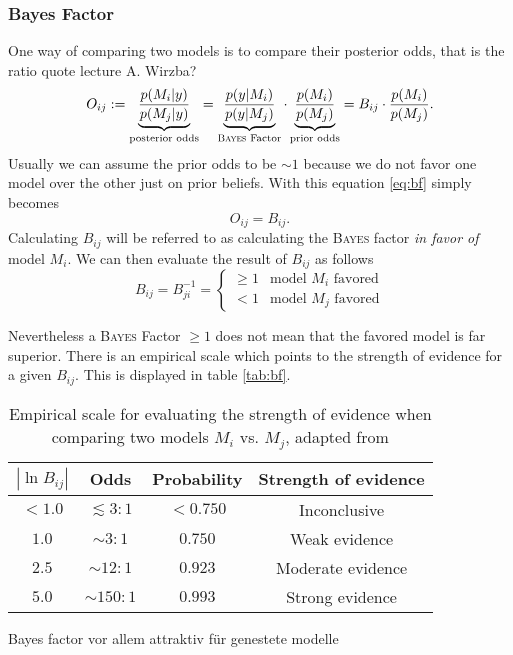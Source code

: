 \documentclass[%
 reprint,
 amsmath,amssymb,
 aps,
]{revtex4-1}
\begin{document}
\subsubsection{\textbf{Bayes Factor}}
One way of comparing two models is to compare their posterior odds, that is the ratio {\color{red} quote lecture A. Wirzba?} \begin{equation}\label{eq:bf}O_{ij}:=\underbrace{\frac{p(M_i|y)}{p(M_j|y)}}_{\text{posterior odds}}=\underbrace{\frac{p(y|M_i)}{p(y|M_j)}}_{\text{\textsc{Bayes} Factor}}\cdot\underbrace{\frac{p(M_i)}{p(M_j)}}_{\text{prior odds}}=B_{ij}\cdot\frac{p(M_i)}{p(M_j)}.\end{equation}
Usually we can assume the prior odds to be $\sim 1$ because we do not favor one model over the other just on prior beliefs. With this equation \eqref{eq:bf} simply becomes $$O_{ij}=B_{ij}.$$
Calculating $B_{ij}$ will be referred to as calculating the \textsc{Bayes} factor \emph{in favor of} model $M_i$. We can then evaluate the result of $B_{ij}$ as follows 
\begin{equation*}
	B_{ij}=B_{ji}^{-1}=\begin{cases} \geq 1 & \text{model } M_i \text{ favored}\\
	 <1 & \text{model } M_j \text{ favored}
	\end{cases}
\end{equation*}

Nevertheless a \textsc{Bayes} Factor $\geq1$ does not mean that the favored model is far superior. There is an empirical scale which points to the strength of evidence for a given $B_{ij}$. This is displayed in table \eqref{tab:bf}.


\begin{table}[htbp]

	\centering
	{\renewcommand{\arraystretch}{1.3}
	\begin{tabular}{|c|c|c|c|}
		\hline
		$|\ln B_{ij}|$& Odds & Probability & Strength of evidence \\
		\hline
		$< 1.0$& $ \lesssim 3:1$ & $< 0.750$  & Inconclusive  \\
		$1.0$ & $\sim 3:1$ & $0.750$ & Weak evidence  \\
		$2.5$& $\sim 12:1$ & $0.923$ & Moderate evidence \\
		$5.0$& $\sim 150:1$ & $0.993$ & Strong evidence \\
		\hline
	\end{tabular}}
\caption{Empirical scale for evaluating the strength of evidence when comparing two models $M_i$ vs. $M_j$, adapted from \cite{Trotta_2008}}
\label{tab:bf}
\end{table}
{\color{red} Bayes factor vor allem attraktiv für genestete modelle}
\end{document}
